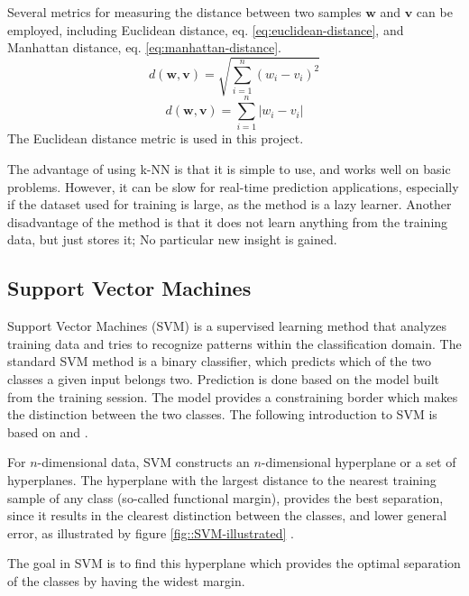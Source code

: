 Several metrics for measuring the distance between
two samples \(\mathbf{w}\) and \(\mathbf{v}\) can be employed,
including Euclidean distance, eq. \eqref{eq:euclidean-distance},
and Manhattan distance, eq. \eqref{eq:manhattan-distance}.
\begin{equation}
d(\mathbf{w},\mathbf{v}) = \sqrt{\sum_{i=1}^n (w_i - v_i)^2}
\label{eq:euclidean-distance}
\end{equation}
\begin{equation}
d(\mathbf{w},\mathbf{v}) = \sum_{i=1}^n \left|w_i - v_i\right|
\label{eq:manhattan-distance}
\end{equation}
The Euclidean distance metric is used in this project.

The advantage of using k-NN is that it is simple to use,
and works well on basic problems.
However, it can be slow for real-time prediction applications,
especially if the dataset used for training is large,
as the method is a lazy learner.
Another disadvantage of the method is that it does not
learn anything from the training data, but just stores it;
No particular new insight is gained.
 
\subsection{Support Vector Machines}
\label{sec:svm}
Support Vector Machines (SVM) is a supervised learning
method that analyzes training data 
and tries to recognize patterns within the classification domain.
The standard SVM method is a binary classifier,
which predicts which of the two classes a given input belongs two. 
Prediction is done based on the model built from the training session.
The model provides a constraining border which makes the distinction
between the two classes.
The following introduction to SVM is based on \citep{svmwiki} and \citep{mlwr}.

For \(n\)-dimensional data,
SVM constructs an \(n\)-dimensional hyperplane or a set of hyperplanes.
The hyperplane with the largest distance to the nearest training sample
of any class (so-called functional margin), provides the best separation,
since it results in the clearest distinction between the classes,
and lower general error,
as illustrated by figure \ref{fig::SVM-illustrated} \citep{svmmathworks}.

The goal in SVM is to find this hyperplane which provides the optimal separation 
of the classes by having the widest margin. 

